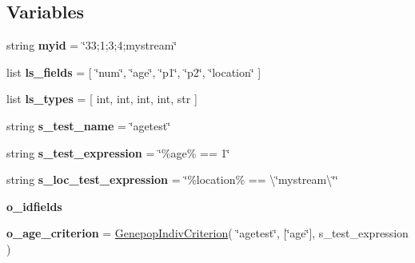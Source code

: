 \subsection*{Variables}
\begin{DoxyCompactItemize}
\item 
string {\bfseries myid} = \char`\"{}33;1;3;4;mystream\char`\"{}\hypertarget{namespacenegui_1_1genepopindividualid_af6ed233c4435be4a02a0970d01dca9e7}{}\label{namespacenegui_1_1genepopindividualid_af6ed233c4435be4a02a0970d01dca9e7}

\item 
list {\bfseries ls\+\_\+fields} = \mbox{[} \char`\"{}num\char`\"{}, \char`\"{}age\char`\"{}, \char`\"{}p1\char`\"{}, \char`\"{}p2\char`\"{}, \char`\"{}location\char`\"{} \mbox{]}\hypertarget{namespacenegui_1_1genepopindividualid_a15941e0f11f897a77e483a4001aa2468}{}\label{namespacenegui_1_1genepopindividualid_a15941e0f11f897a77e483a4001aa2468}

\item 
list {\bfseries ls\+\_\+types} = \mbox{[} int, int, int, int, str \mbox{]}\hypertarget{namespacenegui_1_1genepopindividualid_a5107a92b772272272b84c01f117d0632}{}\label{namespacenegui_1_1genepopindividualid_a5107a92b772272272b84c01f117d0632}

\item 
string {\bfseries s\+\_\+test\+\_\+name} = \char`\"{}agetest\char`\"{}\hypertarget{namespacenegui_1_1genepopindividualid_a5b0c052d184471ae8e6f43fa59b5539a}{}\label{namespacenegui_1_1genepopindividualid_a5b0c052d184471ae8e6f43fa59b5539a}

\item 
string {\bfseries s\+\_\+test\+\_\+expression} = \char`\"{}\%age\% == 1\char`\"{}\hypertarget{namespacenegui_1_1genepopindividualid_a1a46f1d4e2acfd686e2458ee914ccbfd}{}\label{namespacenegui_1_1genepopindividualid_a1a46f1d4e2acfd686e2458ee914ccbfd}

\item 
string {\bfseries s\+\_\+loc\+\_\+test\+\_\+expression} = \char`\"{}\%location\% == \textbackslash{}\char`\"{}mystream\textbackslash{}\char`\"{}\char`\"{}\hypertarget{namespacenegui_1_1genepopindividualid_a4e46c512e7d8dedf2fd09a09ef2a2428}{}\label{namespacenegui_1_1genepopindividualid_a4e46c512e7d8dedf2fd09a09ef2a2428}

\item 
{\bfseries o\+\_\+idfields}
\item 
{\bfseries o\+\_\+age\+\_\+criterion} = \hyperlink{classnegui_1_1genepopindividualid_1_1GenepopIndivCriterion}{Genepop\+Indiv\+Criterion}( \char`\"{}agetest\char`\"{}, \mbox{[}\char`\"{}age\char`\"{}\mbox{]}, s\+\_\+test\+\_\+expression )\hypertarget{namespacenegui_1_1genepopindividualid_a519f33cf7aa39f2badb028ba8c5a6030}{}\label{namespacenegui_1_1genepopindividualid_a519f33cf7aa39f2badb028ba8c5a6030}


\end{DoxyCompactItemize}
